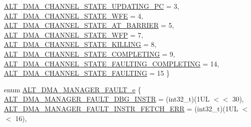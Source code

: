 \begin{DoxyCompactItemize}
\mbox{\hyperlink{group__ALT__DMA__CSR_gga9d1bf45cfd52c9e0c603c1462b32ea50aaf7b858a3db781b0b5c18b4597bc7b51}{A\+L\+T\+\_\+\+D\+M\+A\+\_\+\+C\+H\+A\+N\+N\+E\+L\+\_\+\+S\+T\+A\+T\+E\+\_\+\+U\+P\+D\+A\+T\+I\+N\+G\+\_\+\+PC}} = 3, 
\newline
\mbox{\hyperlink{group__ALT__DMA__CSR_gga9d1bf45cfd52c9e0c603c1462b32ea50af295d31d040256ef8b8e3bed804c0b94}{A\+L\+T\+\_\+\+D\+M\+A\+\_\+\+C\+H\+A\+N\+N\+E\+L\+\_\+\+S\+T\+A\+T\+E\+\_\+\+W\+FE}} = 4, 
\mbox{\hyperlink{group__ALT__DMA__CSR_gga9d1bf45cfd52c9e0c603c1462b32ea50ab6e565317227a9b8edb26f1ff95f1451}{A\+L\+T\+\_\+\+D\+M\+A\+\_\+\+C\+H\+A\+N\+N\+E\+L\+\_\+\+S\+T\+A\+T\+E\+\_\+\+A\+T\+\_\+\+B\+A\+R\+R\+I\+ER}} = 5, 
\mbox{\hyperlink{group__ALT__DMA__CSR_gga9d1bf45cfd52c9e0c603c1462b32ea50a9212c8315d8c4e4bd5fac4a1654ee3dc}{A\+L\+T\+\_\+\+D\+M\+A\+\_\+\+C\+H\+A\+N\+N\+E\+L\+\_\+\+S\+T\+A\+T\+E\+\_\+\+W\+FP}} = 7, 
\mbox{\hyperlink{group__ALT__DMA__CSR_gga9d1bf45cfd52c9e0c603c1462b32ea50a95a48e526d7e045eac0ecd454fd3eb9e}{A\+L\+T\+\_\+\+D\+M\+A\+\_\+\+C\+H\+A\+N\+N\+E\+L\+\_\+\+S\+T\+A\+T\+E\+\_\+\+K\+I\+L\+L\+I\+NG}} = 8, 
\newline
\mbox{\hyperlink{group__ALT__DMA__CSR_gga9d1bf45cfd52c9e0c603c1462b32ea50ad7e937b4f78c5fd55eeaf748025a2f99}{A\+L\+T\+\_\+\+D\+M\+A\+\_\+\+C\+H\+A\+N\+N\+E\+L\+\_\+\+S\+T\+A\+T\+E\+\_\+\+C\+O\+M\+P\+L\+E\+T\+I\+NG}} = 9, 
\mbox{\hyperlink{group__ALT__DMA__CSR_gga9d1bf45cfd52c9e0c603c1462b32ea50a0658ae666fb858e038763027c10f5c42}{A\+L\+T\+\_\+\+D\+M\+A\+\_\+\+C\+H\+A\+N\+N\+E\+L\+\_\+\+S\+T\+A\+T\+E\+\_\+\+F\+A\+U\+L\+T\+I\+N\+G\+\_\+\+C\+O\+M\+P\+L\+E\+T\+I\+NG}} = 14, 
\mbox{\hyperlink{group__ALT__DMA__CSR_gga9d1bf45cfd52c9e0c603c1462b32ea50a7141e5d0da32f727dc56b2d0922daac3}{A\+L\+T\+\_\+\+D\+M\+A\+\_\+\+C\+H\+A\+N\+N\+E\+L\+\_\+\+S\+T\+A\+T\+E\+\_\+\+F\+A\+U\+L\+T\+I\+NG}} = 15
 \}
\item 
enum \mbox{\hyperlink{group__ALT__DMA__CSR_gab44582b3022f4047c4cdd70b80155e44}{A\+L\+T\+\_\+\+D\+M\+A\+\_\+\+M\+A\+N\+A\+G\+E\+R\+\_\+\+F\+A\+U\+L\+T\+\_\+e}} \{ \newline
\mbox{\hyperlink{group__ALT__DMA__CSR_ggab44582b3022f4047c4cdd70b80155e44ac097f18d93049173827328e8552c2524}{A\+L\+T\+\_\+\+D\+M\+A\+\_\+\+M\+A\+N\+A\+G\+E\+R\+\_\+\+F\+A\+U\+L\+T\+\_\+\+D\+B\+G\+\_\+\+I\+N\+S\+TR}} = (int32\+\_\+t)(1UL $<$$<$ 30), 
\mbox{\hyperlink{group__ALT__DMA__CSR_ggab44582b3022f4047c4cdd70b80155e44aeb6e78d343a31426a1036e0db7d35581}{A\+L\+T\+\_\+\+D\+M\+A\+\_\+\+M\+A\+N\+A\+G\+E\+R\+\_\+\+F\+A\+U\+L\+T\+\_\+\+I\+N\+S\+T\+R\+\_\+\+F\+E\+T\+C\+H\+\_\+\+E\+RR}} = (int32\+\_\+t)(1UL $<$$<$ 16), 

\end{DoxyCompactItemize}
